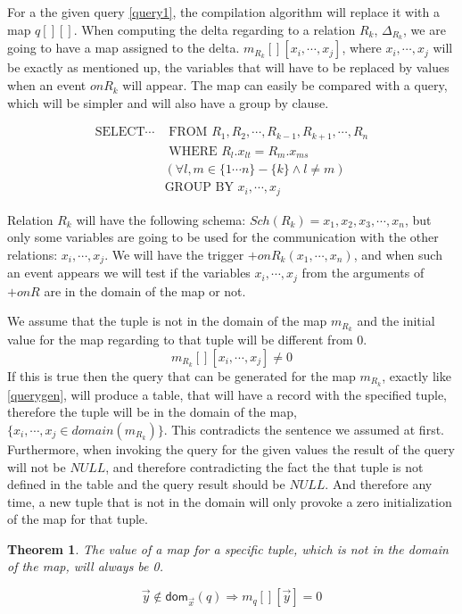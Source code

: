 \documentclass[12pt]{article}
\newtheorem{theorem}{Theorem}[section]
\newcommand{\dom}{\textsf{dom}}
\begin{document}
For a the given query \ref{query1}, the compilation algorithm will replace it with a map $q[][]$. When computing the delta regarding to a relation $R_k$, $\Delta_{R_k}$, we are going to have a map assigned to the delta. $m_{R_k}[][x_i,\cdots,x_j]$, where $x_i,\cdots,x_j$ will be exactly as mentioned up, the variables that will have to be replaced by values when an event $onR_k$ will appear. The map can easily be compared with a query, which will be simpler and will also have a group by clause.

\begin{align}
\text{SELECT}\cdots&\text{ FROM }R_1,R_2,\cdots,R_{k-1},R_{k+1},\cdots,R_n\label{querygen}\\
&\text{ WHERE }R_l.x_{lt}=R_m.x_{ms}\nonumber\\
&(\forall l,m\in\{1\cdots n\}-\{k\}\land l\not=m)\nonumber\\
&\text{GROUP BY } x_i,\cdots,x_j\nonumber
\end{align}
	
Relation $R_k$ will have the following schema: $Sch(R_k)={x_1,x_2,x_3,\cdots,x_n}$, but only some variables are going to be used for the communication with the other relations: $x_i,\cdots,x_j$. We will have the trigger $+onR_k(x_1,\cdots,x_n)$, and when such an event appears we will test if the variables $x_i,\cdots,x_j$ from the arguments of $+onR$ are in the domain of the map or not. 
	
We assume that the tuple is not in the domain of the map $m_{R_k}$ and the initial value for the map regarding to that tuple will be different from 0.
$$m_{R_k}[][x_i,\cdots,x_j]\not= 0$$
If this is true then the query that can be generated for the map $m_{R_k}$, exactly like \ref{querygen},
will produce a table, that will have a record with the specified tuple, therefore the tuple will be in the domain of the map, $\{x_i,\cdots,x_j\in domain(m_{R_k}) \}$. This contradicts the sentence we assumed at first. Furthermore, when invoking the query for the given values the result of the query will not be $NULL$, and therefore contradicting the fact the that tuple is not defined in the table and the query result should be $NULL$. And therefore any time, a new tuple that is not in the domain will only provoke a zero initialization of the map for that tuple.

\begin{theorem}
The value of a map for a specific tuple, which is not in the domain of the map, will always be 0.
\end{theorem}
$$\vec{y}\notin\dom{}_{\vec{x}}(q)\Rightarrow m_q[][\vec{y}]=0$$
\end{document}
